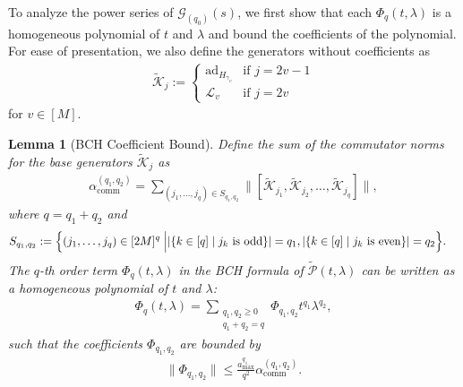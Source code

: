 \documentclass[aps,pra,reprint,groupedaddress,floatfix]{revtex4-2}
\newtheorem{lemma}{Lemma}
\newcommand{\ad}{\mathrm{ad}}
\renewcommand{\P}{\mathcal{P}}
\newcommand{\G}{\mathcal{G}}
\renewcommand{\comm}{\mathrm{comm}}
\newcommand{\mc}{\mathcal}
\begin{document}
To analyze the power series of $\G_{(q_0)}(s)$, we first show that each $\Phi_q(t,\lambda)$ is a homogeneous polynomial of $t$ and $\lambda$ and bound the coefficients of the polynomial. For ease of presentation, we also define the generators without coefficients as
\begin{align}
\label{eq:def-K-tilde}
 	\tilde{\mathcal{K}}_j := \begin{cases}\ad_{H_{\gamma_v}} & \text{if } j = 2v-1\\ \mathcal{L}_v & \text{if } j = 2v \end{cases}
\end{align}
for $v \in [M]$.
\begin{lemma}[BCH Coefficient Bound]
\label{lem:bch-bound}
 	Define the sum of the commutator norms for the base generators $\tilde{\mc K}_j$ as
 	\begin{align}
 	\label{eq:alpha-q-q}
 	\alpha_{\comm}^{(q_1, q_2)}=\sum_{(j_1, \ldots, j_q)\in S_{q_1, q_2}}\big\|[\tilde{\mc K}_{j_1}, \tilde{\mc K}_{j_2},\ldots,\tilde{\mc K}_{j_q}]\big\|,
 	\end{align}
 	where $q = q_1+q_2$ and
 	\begin{align}
 	\label{eq:S-q-q}
 	 	S_{q_1, q_2}:=\Bigl\{(j_1, \ldots, j_q)\in [2M]^q\Bigm| &|\{k\in [q]\mid j_k \text{ is odd}\}|=q_1, |\{k\in [q]\mid j_k \text{ is even}\}|=q_2\Bigr\}. \nonumber
 	\end{align}
 	The $q$-th order term $\Phi_q(t,\lambda)$ in the BCH formula of $\tilde{\P}(t,\lambda)$ can be written as a homogeneous polynomial of $t$ and $\lambda$:
 	\begin{align}
 	\Phi_q(t,\lambda) = \sum_{\substack{q_1, q_2 \ge 0\\q_1+q_2 = q}}\Phi_{q_1, q_2} t^{q_1}\lambda^{q_2},
 	\end{align}
 	such that the coefficients $\Phi_{q_1, q_2}$ are bounded by
 	\begin{align}
 	\|\Phi_{q_1, q_2}\|\le \frac{a_{\max}^{q_1}}{q^2}\alpha_{\comm}^{(q_1, q_2)}.
 	\end{align}
\end{lemma}
\end{document}

